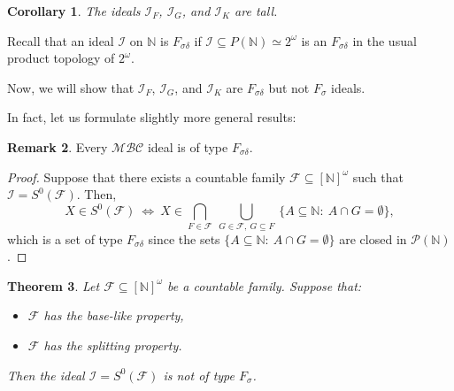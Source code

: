 \documentclass{amsart}
\newtheorem{thm}{Theorem}[section]
\newtheorem{cor}[thm]{Corollary}
\theoremstyle{definition}
\newtheorem{remark}[thm]{Remark}
\newcommand{\N}{{\mathbb N}}
\newcommand{\I}{\mathcal I}
\newcommand{\InfSubs}{[\N]^{\omega}}
\newcommand{\MB}{S^0}
\newcommand{\MBC}{\mathcal{MBC}}
\begin{document}
\begin{cor} \label{tall}
The ideals $\I_F$, $\I_G$, and $\I_K$ are tall.
\end{cor}

Recall that an ideal $\I$ on $\N$ is $F_{\sigma\delta}$ if
$\I \subseteq P(\N) \simeq 2^\omega$
is an $F_{\sigma\delta}$ in the usual product topology
of $2^\omega$.

Now, we will show that $\I_F$, $\I_G$, and $\I_K$ are $F_{\sigma\delta}$ but not $F_{\sigma}$ ideals.

In fact, let us formulate slightly more general results:

\begin{remark}
Every $\MBC$ ideal is of type $F_{\sigma\delta}$.
\end{remark}

\begin{proof}
Suppose that there exists a countable family $\mathcal{F}\subseteq \InfSubs$ such that $\I = \MB(\mathcal{F})$. Then,
$$X\in \MB(\mathcal{F})\ \Longleftrightarrow\ X\in \bigcap_{F\in\mathcal{F}}\ \bigcup_{G\in\mathcal{F},\ G\subseteq F}\ \{A\subseteq\N :\ A\cap G=\emptyset\},$$
which is a set of type $F_{\sigma\delta}$ since the sets $\{A\subseteq\N :\ A\cap G=\emptyset\}$ are closed in $\mathcal{P}(\N)$.
\end{proof}

\begin{thm} \label{thmFsigma}
Let $\mathcal{F}\subseteq \InfSubs$ be a countable family. Suppose that: 
\begin{itemize}
	\item[$(i)$] $\mathcal{F}$ has the base-like property,
	\item[$(ii)$] $\mathcal{F}$ has the splitting property.
\end{itemize} 
Then the ideal $\I=\MB(\mathcal{F})$ is not of type $F_{\sigma}$.
\end{thm}
\end{document}
